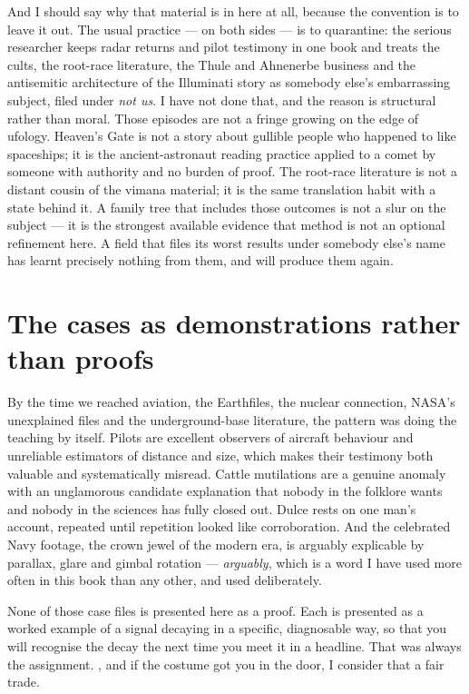 And I should say why that material is in here at all, because the convention is
to leave it out. The usual practice --- on both sides --- is to quarantine: the
serious researcher keeps radar returns and pilot testimony in one book and treats
the cults, the root-race literature, the Thule and Ahnenerbe business and the
antisemitic architecture of the Illuminati story as somebody else's embarrassing
subject, filed under \emph{not us}. I have not done that, and the reason is
structural rather than moral. Those episodes are not a fringe growing on the
edge of ufology. 
Heaven's Gate is not a story about gullible people
who happened to like spaceships; it is the ancient-astronaut reading practice
applied to a comet by someone with authority and no burden of proof. The root-race
literature is not a distant cousin of the vimana material; it is the same
translation habit with a state behind it. A family tree that includes those
outcomes is not a slur on the subject --- it is the strongest available evidence
that method is not an optional refinement here. A field that files its worst
results under somebody else's name has learnt precisely nothing from them, and
will produce them again.

\section*{The cases as demonstrations rather than proofs}

By the time we reached aviation, the Earthfiles, the nuclear connection, NASA's
unexplained files and the underground-base literature, the pattern was doing the
teaching by itself. Pilots are excellent observers of aircraft behaviour and
unreliable estimators of distance and size, which makes their testimony both
valuable and systematically misread. Cattle mutilations are a genuine anomaly
with an unglamorous candidate explanation that nobody in the folklore wants and
nobody in the sciences has fully closed out. Dulce rests on one man's account,
repeated until repetition looked like corroboration. And the celebrated Navy
footage, the crown jewel of the modern era, is arguably explicable by parallax,
glare and gimbal rotation --- \emph{arguably}, which is a word I have used more
often in this book than any other, and used deliberately.

None of those case files is presented here as a proof. Each is presented as a
worked example of a signal decaying in a specific, diagnosable way, so that you
will recognise the decay the next time you meet it in a headline. That was always
the assignment. , and if the costume got you in the door, I consider that a
fair trade.

